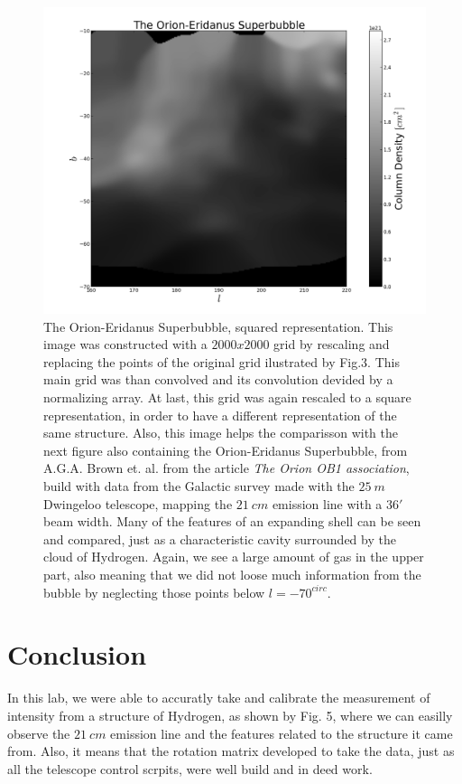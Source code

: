 \documentclass{article}
\begin{document}
\begin{figure}[H]
\center
\includegraphics[scale=0.52]{final_orion_spred.png}
\caption {The Orion-Eridanus Superbubble, squared representation. 
This image was constructed with a 
$2000x2000$ grid by rescaling and replacing the points of the original grid
ilustrated by Fig.3. This main grid was than convolved and its convolution devided
by a normalizing array. At last, this grid was again rescaled to a square representation,
in order to have a different representation of the same structure. Also, this image
helps the comparisson with the next figure also containing the Orion-Eridanus Superbubble,
from A.G.A. Brown et. al. from the article \emph{The Orion OB1 association}, build with
data from the Galactic survey made with the $25 \ m$ Dwingeloo telescope, mapping the
$21 \ cm$ emission line with a $36'$ beam width. 
Many of the features of an expanding shell can be seen and compared,
just as a characteristic cavity surrounded by the cloud of Hydrogen. Again,
we see a large amount of gas in the upper part, also meaning that we did not loose 
much information from the bubble by neglecting those points below $l=-70^{circ}$.} 
\label{m17}
\end{figure}


\section{Conclusion}

In this lab, we were able to accuratly take and calibrate the measurement of 
intensity from a structure of Hydrogen, as shown by Fig. 5, where we can easilly 
observe the $21 \ cm$ emission line and the features related to the structure it came from. 
Also, it means that the rotation matrix developed to take the data, just as all the
telescope control scrpits, were well build and in deed work.
 
\end{document}
